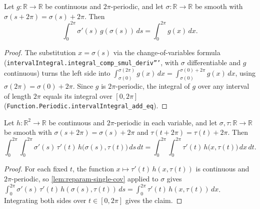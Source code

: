 \begin{lemma}
    \label{lem:reparam-single-cov}
    Let $g:\mathbb{R}\to\mathbb{R}$ be continuous and $2\pi$-periodic, and let
    $\sigma:\mathbb{R}\to\mathbb{R}$ be smooth with $\sigma(s+2\pi)=\sigma(s)+2\pi$.
    Then
    \[
        \int_0^{2\pi}\sigma'(s)\,g(\sigma(s))\,ds = \int_0^{2\pi} g(x)\,dx .
    \]
\end{lemma}
\begin{proof}
    The substitution $x=\sigma(s)$ via the change-of-variables formula
    (\texttt{intervalIntegral.integral\_comp\_smul\_deriv'''}, with $\sigma$
    differentiable and $g$ continuous) turns the left side into
    $\int_{\sigma(0)}^{\sigma(2\pi)} g(x)\,dx=\int_{\sigma(0)}^{\sigma(0)+2\pi}g(x)\,dx$,
    using $\sigma(2\pi)=\sigma(0)+2\pi$. Since $g$ is $2\pi$-periodic, the integral of
    $g$ over any interval of length $2\pi$ equals its integral over $[0,2\pi]$
    (\texttt{Function.Periodic.intervalIntegral\_add\_eq}).
\end{proof}

\begin{lemma}
    \label{lem:reparam-inner-cov}
    Let $h:\mathbb{R}^2\to\mathbb{R}$ be continuous and $2\pi$-periodic in each
    variable, and let $\sigma,\tau:\mathbb{R}\to\mathbb{R}$ be smooth with
    $\sigma(s+2\pi)=\sigma(s)+2\pi$ and $\tau(t+2\pi)=\tau(t)+2\pi$. Then
    \[
        \int_0^{2\pi}\!\!\int_0^{2\pi}\sigma'(s)\,\tau'(t)\,h\bigl(\sigma(s),\tau(t)\bigr)\,ds\,dt
        = \int_0^{2\pi}\!\!\int_0^{2\pi}\tau'(t)\,h\bigl(x,\tau(t)\bigr)\,dx\,dt .
    \]
\end{lemma}
\begin{proof}
    For each fixed $t$, the function $x\mapsto\tau'(t)\,h(x,\tau(t))$ is continuous
    and $2\pi$-periodic, so \cref{lem:reparam-single-cov} applied to $\sigma$ gives
    $\int_0^{2\pi}\sigma'(s)\,\tau'(t)\,h(\sigma(s),\tau(t))\,ds
       =\int_0^{2\pi}\tau'(t)\,h(x,\tau(t))\,dx$. Integrating both sides over
    $t\in[0,2\pi]$ gives the claim.
\end{proof}

